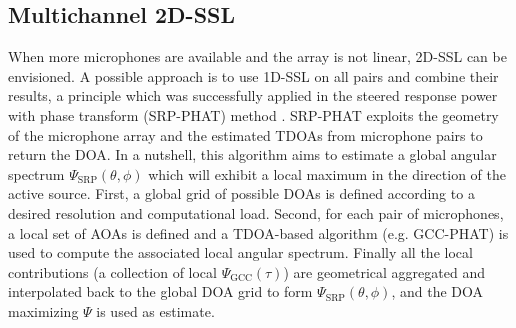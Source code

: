\subsection{Multichannel 2D-SSL}\label{subsec:mirage:2D-SSL}
When more microphones are available and the array is not linear, 2D-SSL can be envisioned.
A possible approach is to use 1D-SSL on all pairs and combine their results,
a principle which was successfully applied in the steered response power with phase transform (SRP-PHAT) method \cite{DiBiase2001}.
SRP-PHAT exploits the geometry of the microphone array and the estimated TDOAs from microphone pairs to return the DOA.
In a nutshell, this algorithm aims to estimate a global angular spectrum $\Psi_{\text{SRP}}(\theta,\phi)$
which will exhibit a local maximum in the direction of the active source.
First, a global grid of possible DOAs is defined according to a desired resolution and computational load.
Second, for each pair of microphones, a local set of AOAs is defined and a TDOA-based algorithm (e.g. GCC-PHAT)
is used to compute the associated local angular spectrum.
Finally all the local contributions (a collection of local $\Psi_\text{GCC}(\tau)$) are geometrical
aggregated and interpolated back to the global DOA grid to form $\Psi_{\text{SRP}}(\theta,\phi)$,
and the DOA maximizing $\Psi$ is used as estimate.


